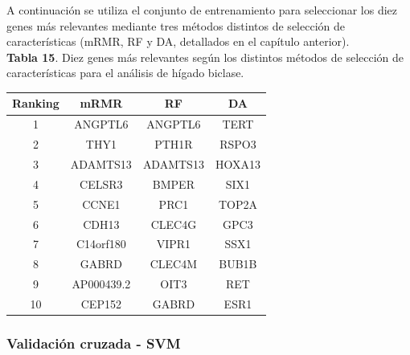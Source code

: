A continuación se utiliza el conjunto de entrenamiento para seleccionar los diez genes más relevantes mediante tres métodos distintos de selección de características (mRMR, RF y DA, detallados en el capítulo anterior).\\

\textbf{Tabla 15}. Diez genes más relevantes según los distintos métodos de selección de características para el análisis de hígado biclase.

\begin{table}[H]
	\centering
	\begin{tabular}{cccc}
		\hline
		\textbf{Ranking} & \textbf{mRMR} & \textbf{RF} & \textbf{DA} \\ \hline
		1                & ANGPTL6       & ANGPTL6     & TERT        \\
		2                & THY1          & PTH1R       & RSPO3       \\
		3                & ADAMTS13      & ADAMTS13    & HOXA13      \\
		4                & CELSR3        & BMPER       & SIX1        \\
		5                & CCNE1         & PRC1        & TOP2A       \\
		6                & CDH13         & CLEC4G      & GPC3        \\
		7                & C14orf180     & VIPR1       & SSX1        \\
		8                & GABRD         & CLEC4M      & BUB1B       \\
		9                & AP000439.2    & OIT3        & RET         \\
		10               & CEP152        & GABRD       & ESR1        \\ \hline
	\end{tabular}
\end{table}

\newpage
\subsubsection{Validación cruzada - SVM}

